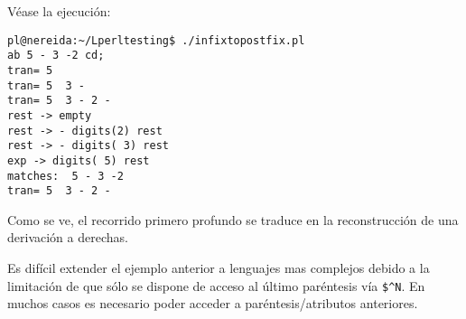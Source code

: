 Véase la ejecución:
\begin{verbatim}
pl@nereida:~/Lperltesting$ ./infixtopostfix.pl
ab 5 - 3 -2 cd;
tran= 5
tran= 5  3 -
tran= 5  3 - 2 -
rest -> empty
rest -> - digits(2) rest
rest -> - digits( 3) rest
exp -> digits( 5) rest
matches:  5 - 3 -2
tran= 5  3 - 2 -
\end{verbatim}

Como se ve, el recorrido primero profundo se 
traduce en la reconstrucción de una derivación a derechas.


Es difícil extender el ejemplo anterior a lenguajes mas complejos debido a la 
limitación de que sólo se dispone de acceso al último paréntesis vía \verb|$^N|.
En muchos casos es necesario poder acceder a paréntesis/atributos anteriores.

